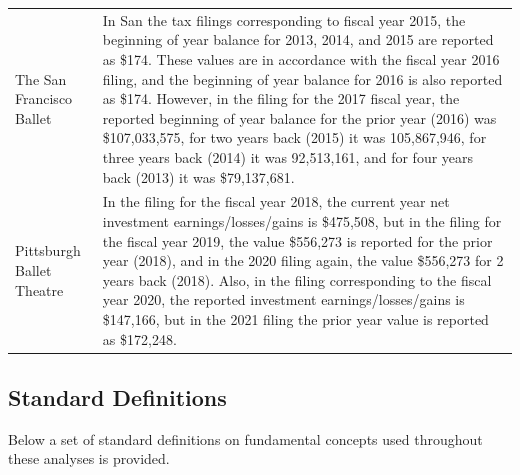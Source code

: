 \documentclass[Dance Data
Project,article,submit,moreauthors,pdftex]{mdpi}
\begin{document}
\begin{table}[H]
\begin{tabular}[t]{l>{\raggedright\arraybackslash}p{35em}}
\addlinespace
The San Francisco Ballet & In San the tax filings corresponding to fiscal year 2015, the beginning of year balance for 2013, 2014, and 2015 are reported as \$174.  These values are in accordance with the fiscal year 2016 filing, and the beginning of year balance for 2016 is also reported as \$174.  However, in the filing for the 2017 fiscal year, the reported beginning of year balance for the prior year (2016) was \$107,033,575, for two years back (2015) it was  105,867,946, for three years back (2014) it was 92,513,161, and for four years back (2013) it was \$79,137,681.\\
\addlinespace
Pittsburgh Ballet Theatre & In the filing for the fiscal year 2018, the current year net investment earnings/losses/gains is \$475,508, but in the filing for the fiscal year 2019, the value \$556,273 is reported for the prior year (2018), and in the 2020 filing again, the value \$556,273 for 2 years back (2018). Also, in the filing corresponding to the fiscal year 2020, the reported investment earnings/losses/gains is \$147,166, but in the 2021 filing the prior year value is reported as \$172,248.\\
\bottomrule
\end{tabular}
\end{table}

\newpage

\hypertarget{standard-definitions}{%
\subsection{Standard Definitions}\label{standard-definitions}}

Below a set of standard definitions on fundamental concepts used
throughout these analyses is provided.
\end{document}

